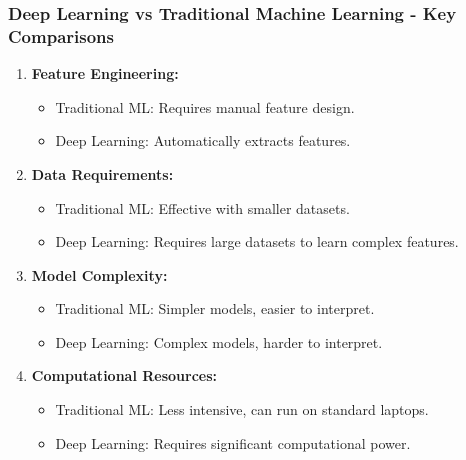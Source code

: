 \documentclass[aspectratio=169]{beamer}
\begin{document}
\begin{frame}[fragile]
    \frametitle{Deep Learning vs Traditional Machine Learning - Key Comparisons}
    \begin{enumerate}
        \item \textbf{Feature Engineering:}
        \begin{itemize}
            \item Traditional ML: Requires manual feature design.
            \item Deep Learning: Automatically extracts features.
        \end{itemize}
        
        \item \textbf{Data Requirements:}
        \begin{itemize}
            \item Traditional ML: Effective with smaller datasets.
            \item Deep Learning: Requires large datasets to learn complex features.
        \end{itemize}
        
        \item \textbf{Model Complexity:}
        \begin{itemize}
            \item Traditional ML: Simpler models, easier to interpret.
            \item Deep Learning: Complex models, harder to interpret.
        \end{itemize}

        \item \textbf{Computational Resources:}
        \begin{itemize}
            \item Traditional ML: Less intensive, can run on standard laptops.
            \item Deep Learning: Requires significant computational power.
        \end{itemize}
    \end{enumerate}
\end{frame}
\end{document}
